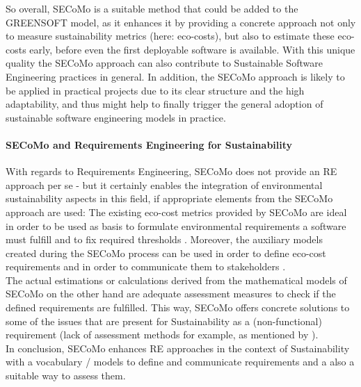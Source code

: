 So overall, SECoMo is a suitable method that could be added to the GREENSOFT model, as it enhances it by providing a concrete approach not only to measure sustainability metrics (here: eco-costs), but also to estimate these eco-costs early, before even the first deployable software is available. With this unique quality the SECoMo approach can also contribute to Sustainable Software Engineering practices in general. %
 In addition, the SECoMo approach is likely to be applied in practical projects due to its clear structure and the high adaptability, and thus might help to finally trigger the general adoption of sustainable software engineering models in practice.


\paragraph{SECoMo and Requirements Engineering for Sustainability}
With regards to Requirements Engineering, SECoMo does not provide an RE approach per se - but it certainly enables the integration of environmental sustainability aspects in this field, if appropriate elements from the SECoMo approach are used: The existing eco-cost metrics provided by SECoMo are ideal in order to be used as basis to formulate environmental requirements a software must fulfill and to fix required thresholds \cite{schulze_cost_2016}. Moreover, the auxiliary models created during the SECoMo process can be used in order to define eco-cost requirements and in order to communicate them to stakeholders \cite{schulze_cost_2016}.\\
The actual estimations or calculations derived from the mathematical models of SECoMo on the other hand are adequate assessment measures to check if the defined requirements are fulfilled. This way, SECoMo offers concrete solutions to some of the issues that are present for Sustainability as a (non-functional) requirement (lack of assessment methods for example, as mentioned by \cite{penzenstadler_safety_2014}).\\
In conclusion, SECoMo enhances RE approaches in the context of Sustainability with a vocabulary / models to define and communicate requirements and a also a suitable way to assess them.


